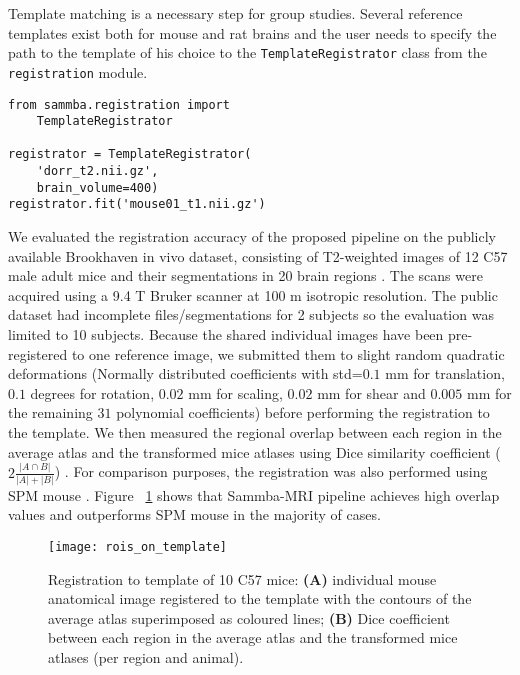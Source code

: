 \documentclass[utf8, a4paper, final, crop]{frontiersSCNS}
\newcommand{\pythoninline}[1]{\texttt{#1}}
\begin{document}
Template matching is a necessary step for group studies. Several reference
templates exist both for mouse and rat brains and the user needs to 
specify the path to the template of his choice to the \pythoninline{TemplateRegistrator}
class from the \pythoninline{registration} module.
%
%
\begin{verbatim}
from sammba.registration import 
    TemplateRegistrator

registrator = TemplateRegistrator(
    'dorr_t2.nii.gz',
    brain_volume=400)
registrator.fit('mouse01_t1.nii.gz')
\end{verbatim}
We evaluated the registration accuracy of the proposed pipeline  on 
the publicly available Brookhaven in vivo dataset, consisting of 
T2-weighted images of 12 C57 male adult mice and
their segmentations in 20 brain regions \citep{ma2008vivo}. The scans were 
acquired using a 9.4 T Bruker scanner at 100 \textmu m isotropic resolution. The 
public dataset had incomplete files/segmentations for 2 subjects so the evaluation was 
limited to 10 subjects.
Because the shared individual images have been pre-registered to one reference image, 
we submitted them to slight random quadratic deformations (Normally 
distributed coefficients with std=$0.1$ mm for translation, $0.1$ degrees for 
rotation, $0.02$ mm for scaling, $0.02$ mm for shear and $0.005$ mm for the remaining $31$ polynomial coefficients) before performing the registration to the template.
We then measured the regional overlap
between each region in the average atlas and the transformed mice atlases 
using Dice similarity coefficient ($2\frac{|A \cap B|}{|A| + |B|}$) .
%
For comparison purposes, the registration was also performed using SPM mouse \citep{sawiak2009spmmouse}.
Figure ~\ref{fig:dices} shows that Sammba-MRI pipeline achieves
high overlap values and outperforms SPM mouse in the majority of cases.
\begin{figure}[h!]
\begin{center}
\texttt{[image: rois\_on\_template]}
\end{center}
\caption{Registration to template of 10 C57 mice: \textbf{(A)} individual mouse anatomical image registered 
to the template with 
the contours of the average atlas superimposed as coloured lines; \textbf{(B)} Dice  
coefficient between each region in the average atlas and the transformed mice atlases 
(per region and animal).}\label{fig:dices}
\end{figure}
\end{document}
